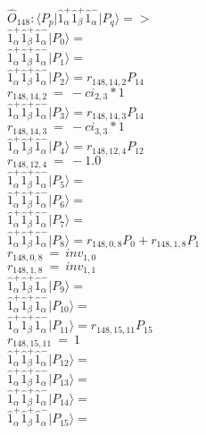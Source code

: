 \documentclass[14pt]{article}
\begin{document}
    $\hat{O}_{148}:  \langle{P_p}\vert \hat{1}_{\alpha}^{+}\hat{1}_{\beta}^{+}\hat{1}_{\alpha}^{-} \vert{P_q}\rangle => $ \\ 
    $ \hat{1}_{\alpha}^{+}\hat{1}_{\beta}^{+}\hat{1}_{\alpha}^{-} \vert{P_{0}}\rangle =  $ \\ 
    $ \hat{1}_{\alpha}^{+}\hat{1}_{\beta}^{+}\hat{1}_{\alpha}^{-} \vert{P_{1}}\rangle =  $ \\ 
    $ \hat{1}_{\alpha}^{+}\hat{1}_{\beta}^{+}\hat{1}_{\alpha}^{-} \vert{P_{2}}\rangle = {r}_{148,14,2}P_{14} $ \\ 
    ${r}_{148,14,2}\ =\ -{ci}_{2,3}*1 $ \\ 
    $ \hat{1}_{\alpha}^{+}\hat{1}_{\beta}^{+}\hat{1}_{\alpha}^{-} \vert{P_{3}}\rangle = {r}_{148,14,3}P_{14} $ \\ 
    ${r}_{148,14,3}\ =\ -{ci}_{3,3}*1 $ \\ 
    $ \hat{1}_{\alpha}^{+}\hat{1}_{\beta}^{+}\hat{1}_{\alpha}^{-} \vert{P_{4}}\rangle = {r}_{148,12,4}P_{12} $ \\ 
    ${r}_{148,12,4}\ =\ -1.0 $ \\ 
    $ \hat{1}_{\alpha}^{+}\hat{1}_{\beta}^{+}\hat{1}_{\alpha}^{-} \vert{P_{5}}\rangle =  $ \\ 
    $ \hat{1}_{\alpha}^{+}\hat{1}_{\beta}^{+}\hat{1}_{\alpha}^{-} \vert{P_{6}}\rangle =  $ \\ 
    $ \hat{1}_{\alpha}^{+}\hat{1}_{\beta}^{+}\hat{1}_{\alpha}^{-} \vert{P_{7}}\rangle =  $ \\ 
    $ \hat{1}_{\alpha}^{+}\hat{1}_{\beta}^{+}\hat{1}_{\alpha}^{-} \vert{P_{8}}\rangle = {r}_{148,0,8}P_{0}+{r}_{148,1,8}P_{1} $ \\ 
    ${r}_{148,0,8}\ =\ {inv}_{1,0} $ \\ 
    ${r}_{148,1,8}\ =\ {inv}_{1,1} $ \\ 
    $ \hat{1}_{\alpha}^{+}\hat{1}_{\beta}^{+}\hat{1}_{\alpha}^{-} \vert{P_{9}}\rangle =  $ \\ 
    $ \hat{1}_{\alpha}^{+}\hat{1}_{\beta}^{+}\hat{1}_{\alpha}^{-} \vert{P_{10}}\rangle =  $ \\ 
    $ \hat{1}_{\alpha}^{+}\hat{1}_{\beta}^{+}\hat{1}_{\alpha}^{-} \vert{P_{11}}\rangle = {r}_{148,15,11}P_{15} $ \\ 
    ${r}_{148,15,11}\ =\ 1 $ \\ 
    $ \hat{1}_{\alpha}^{+}\hat{1}_{\beta}^{+}\hat{1}_{\alpha}^{-} \vert{P_{12}}\rangle =  $ \\ 
    $ \hat{1}_{\alpha}^{+}\hat{1}_{\beta}^{+}\hat{1}_{\alpha}^{-} \vert{P_{13}}\rangle =  $ \\ 
    $ \hat{1}_{\alpha}^{+}\hat{1}_{\beta}^{+}\hat{1}_{\alpha}^{-} \vert{P_{14}}\rangle =  $ \\ 
    $ \hat{1}_{\alpha}^{+}\hat{1}_{\beta}^{+}\hat{1}_{\alpha}^{-} \vert{P_{15}}\rangle =  $ \\ 
    
\end{document}
